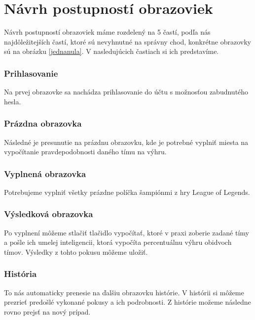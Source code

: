 \section{Návrh postupností obrazoviek}

Návrh postupností obrazoviek máme rozdelený na 5 častí, podľa nás najdôležitejších častí, ktoré sú nevyhnutné na správny chod, konkrétne obrazovky sú na obrázku \ref{jednanula}. V nasledujúcich častiach si ich predstavíme.
\subsubsection{Prihlasovanie}

Na prvej obrazovke sa nachádza prihlasovanie do účtu s možnosťou zabudnutého hesla.

\subsubsection{Prázdna obrazovka}

Následné je presunutie na prázdnu obrazovku, kde je potrebné vyplniť miesta na vypočítanie pravdepodobnosti daného tímu na výhru.

\subsubsection{Vyplnená obrazovka}

Potrebujeme vyplniť všetky prázdne políčka šampiónmi z hry League of Legends.

\subsubsection{Výsledková obrazovka}

Po vyplnení môžeme stlačiť tlačidlo vypočítať, ktoré v praxi zoberie zadané tímy a pošle ich umelej inteligencii, ktorá vypočíta percentuálnu výhru obidvoch tímov. Výsledky z tohto pokusu môžeme uložiť.

\subsubsection{História}

To nás automaticky prenesie na ďalšiu obrazovku histórie. V histórii si môžeme prezrieť predošlé vykonané pokusy a ich podrobnosti. Z histórie možeme následne rovno prejsť na nový prípad.

